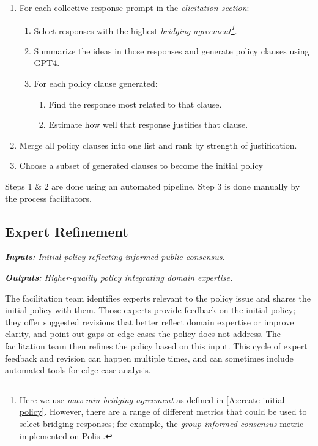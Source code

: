 \documentclass{article}
\begin{document}
\begin{enumerate}
\item For each collective response prompt in the \emph{elicitation section}:
\begin{enumerate}
    \item Select responses with the highest \emph{bridging agreement\footnote{Here we use \emph{max-min bridging agreement} as defined in \ref{A:create initial policy}. However, there are a range of different metrics that could be used to select bridging responses; for example, the \emph{group informed consensus} metric implemented on Polis \cite{small2021polis}.}}.
    \item Summarize the ideas in those responses and generate policy clauses using GPT4.
    \item For each policy clause generated:
    \begin{enumerate}
        \item Find the response most related to that clause.
        \item Estimate how well that response justifies that clause.
    \end{enumerate}
\end{enumerate}
\item Merge all policy clauses into one list and rank by strength of justification.
\item Choose a subset of generated clauses to become the initial policy
\end{enumerate}

Steps 1 \& 2 are done using an automated pipeline. Step 3 is done manually by the process facilitators.

\subsection{Expert Refinement}
\begin{tcolorbox}[colback=blue!5!white,colframe=blue!30!white]
\emph{\textbf{Inputs}: Initial policy reflecting informed public consensus.}

\emph{\textbf{Outputs}: Higher-quality policy integrating domain expertise.}
\end{tcolorbox}

The facilitation team identifies experts relevant to the policy issue and shares the initial policy with them. Those experts provide feedback on the initial policy; they offer suggested revisions that better reflect domain expertise or improve clarity, and point out gaps or edge cases the policy does not address. The facilitation team then refines the policy based on this input. This cycle of expert feedback and revision can happen multiple times, and can sometimes include automated tools for edge case analysis.
\end{document}
